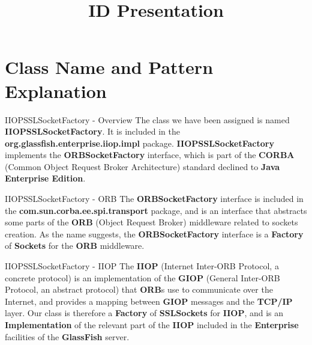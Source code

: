 \documentclass{../common/latex_classes/pdf_presentation}
\title{ID Presentation}
\begin{document}
	\titleToc{}
	\section{Class Name and Pattern Explanation}
	
	\begin{frame}{IIOPSSLSocketFactory - Overview}
		The class we have been assigned is named \textbf{IIOPSSLSocketFactory}.
		It is included in the \textbf{org.glassfish.enterprise.iiop.impl} package.
		\textbf{IIOPSSLSocketFactory} implements the \textbf{ORBSocketFactory} interface, which is part of the \textbf{CORBA} (Common Object Request Broker Architecture) standard declined to \textbf{Java Enterprise Edition}.
	\end{frame}
	
	\begin{frame}{IIOPSSLSocketFactory - ORB}
		The \textbf{ORBSocketFactory} interface is included in the \textbf{com.sun.corba.ee.spi.transport} package, and is an interface that abstracts some parts of the \textbf{ORB} (Object Request Broker) middleware related to sockets creation.
		As the name suggests, the \textbf{ORBSocketFactory} interface is a \textbf{Factory} of \textbf{Sockets} for the \textbf{ORB} middleware.
	\end{frame}
	
	\begin{frame}{IIOPSSLSocketFactory - IIOP}
		The \textbf{IIOP} (Internet Inter-ORB Protocol, a concrete protocol) is an implementation of the \textbf{GIOP} (General Inter-ORB Protocol, an abstract protocol) that \textbf{ORB}s use to communicate over the Internet, and provides a mapping between \textbf{GIOP} messages and the \textbf{TCP/IP} layer.
		Our class is therefore a \textbf{Factory} of \textbf{SSLSockets} for \textbf{IIOP}, and is an \textbf{Implementation} of the relevant part of the \textbf{IIOP} included in the \textbf{Enterprise} facilities of the \textbf{GlassFish} server.
	\end{frame}
	
\end{document}
